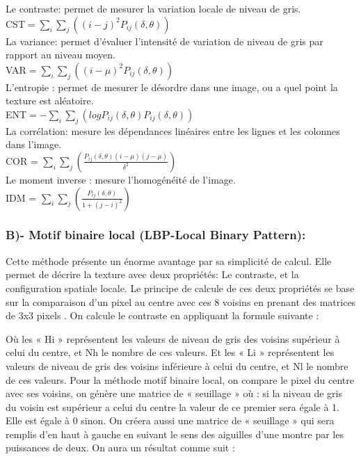 \documentclass[12pt]{article}
\begin{document}
Le contraste: permet de  mesurer la variation locale de niveau de gris.\\

CST$=\sum\limits_{i}\sum\limits_{j} ((i-j)^2 P_{ij}(\delta,\theta))$\\

La variance: permet d’évaluer l’intensité de variation de niveau de gris par rapport au niveau moyen.\\

VAR$=\sum\limits_{i}\sum\limits_{j} ((i-\mu)^2 P_{ij}(\delta,\theta))$\\

L’entropie : permet de mesurer le désordre dans une image, ou a quel point la texture est aléatoire.\\

ENT$= - \sum\limits_{i}\sum\limits_{j} (log P_{ij}(\delta,\theta) P_{ij}(\delta,\theta))$\\

La corrélation: mesure  les dépendances linéaires entre les lignes et les colonnes dans l’image.\\

COR = $\sum\limits_{i}\sum\limits_{j} (\frac{P_{ij}(\delta,\theta)(i-\mu)(j-\mu)}{\delta^2}) $\\

Le moment inverse : mesure l’homogénéité de l’image.\\

IDM = $\sum\limits_{i}\sum\limits_{j} (\frac{P_{ij}(\delta,\theta)}{1+(j-i)^2})$\\

\subsubsection*{B)- Motif binaire local (LBP-Local Binary Pattern):}
Cette méthode présente un énorme avantage par sa simplicité de calcul. Elle permet de décrire la texture avec deux propriétés: Le contraste, et la configuration spatiale locale. 
Le principe de calcule de ces deux propriétés se base sur la comparaison d’un pixel au centre avec ces 8 voisins en prenant des matrices de 3x3 pixels .
On calcule le contraste en appliquant la formule suivante : 

Où les « Hi » représentent les valeurs de niveau de gris des voisins supérieur à celui du centre, et Nh le nombre de ces valeurs. Et les « Li » représentent les valeurs de niveau de gris des voisins inférieure à celui du centre, et Nl le nombre de ces valeurs.
Pour la méthode motif binaire local, on compare le pixel du centre avec ses voisins, on génère une matrice de « seuillage »  où : si la niveau de gris du voisin est supérieur a celui du centre la valeur de ce premier sera égale à 1. Elle est égale à 0 sinon.
On créera aussi une matrice de « seuillage »  qui sera remplis d’en haut à gauche en suivant le sens des  aiguilles d’une montre par les puissances de deux.
On aura un résultat comme suit :
\end{document}
